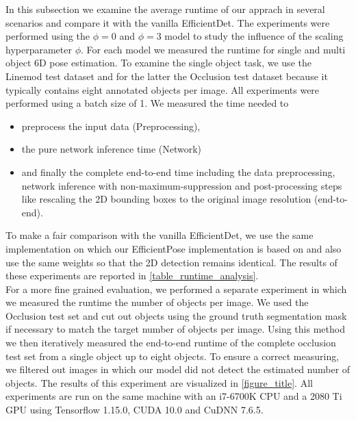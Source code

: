\documentclass[twocolumn, 10pt, letterpaper]{article}
\begin{document}
In this subsection we examine the average runtime of our apprach in several scenarios and compare it with the vanilla EfficientDet\cite{EfficientDet}. The experiments were performed using the $\phi = 0$ and $\phi = 3$ model to study the influence of the scaling hyperparameter $\phi$. For each model we measured the runtime for single and multi object 6D pose estimation. To examine the single object task, we use the Linemod test dataset and for the latter the Occlusion test dataset because it typically contains eight annotated objects per image. All experiments were performed using a batch size of 1. We measured the time needed to
\begin{itemize}
\item preprocess the input data (Preprocessing),
\item the pure network inference time (Network)
\item and finally the complete end-to-end time including the data preprocessing, network inference with non-maximum-suppression and post-processing steps like rescaling the 2D bounding boxes to the original image resolution (end-to-end).
\end{itemize}
 To make a fair comparison with the vanilla EfficientDet, we use the same implementation on which our EfficientPose implementation is based on and also use the same weights so that the 2D detection remains identical. The results of these experiments are reported in \autoref{table_runtime_analysis}.\\
For a more fine grained evaluation, we performed a separate experiment in which we measured the runtime \wrt the number of objects per image. We used the Occlusion test set and cut out objects using the ground truth segmentation mask if necessary to match the target number of objects per image. Using this method we then iteratively measured the end-to-end runtime of the complete occlusion test set from a single object up to eight objects. To ensure a correct measuring, we filtered out images in which our model did not detect the estimated number of objects. The results of this experiment are visualized in \autoref{figure_title}. All experiments are run on the same machine with an i7-6700K CPU and a 2080 Ti GPU using Tensorflow 1.15.0, CUDA 10.0 and CuDNN 7.6.5.\\
\end{document}
